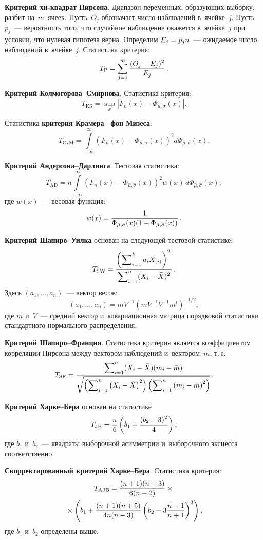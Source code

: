 \begin{multicols}{2}
\textbf{Критерий хи-квадрат Пирсона}. Диапазон переменных, образующих выборку, разбит на~$m$~ячеек. Пусть~$O_j$
обозначает число наблюдений в~ячейке~$j$. Пусть~$p_j$~--- вероятность того, что случайное наблюдение
окажется в~ячейке~$j$ при условии, что нулевая гипотеза верна. Определим $E_j\hm=p_jn$~--- ожидаемое
число наблюдений в~ячейке~$j$. Статистика критерия:
$$
T_{\mathrm{P}}=\sum\limits_{j=1}^m \displaystyle\frac{\displaystyle (O_j-E_j)^2\mathstrut}{\displaystyle E_j\mathstrut}\,.
$$

\textbf{Критерий Колмогорова--Смир\-но\-ва}. Статистика критерия:
$$
T_{\mathrm{KS}}=\sup\limits_x \left\vert F_n(x)-\Phi_{\mu,\sigma}(x)\right\vert.
$$

Статистика \textbf{критерия Крамера\,--\,фон Мизеса}:
$$
T_{\mathrm{CvM}}=\int\limits_{-\infty}^\infty \left(F_n(x)-\Phi_{\hat\mu,\hat\sigma}(x)\right)^2d\Phi_{\hat\mu,\hat\sigma}(x).
$$

\textbf{Критерий Андерсона--Дар\-лин\-га}. Тестовая статистика:
$$
T_{\mathrm{AD}}=n\int\limits_{-\infty}^\infty\left(F_n(x)-\Phi_{\hat\mu,\hat\sigma}(x)\right)^2w(x)\,d\Phi_{\hat\mu,\hat\sigma}(x),
$$
где $w(x)$~--- весовая функция:
$$
w(x)=\displaystyle\frac{\displaystyle 1\mathstrut}{\displaystyle \Phi_{\hat\mu,\hat\sigma}(x)(1-\Phi_{\hat\mu,\hat\sigma}(x))\mathstrut}\,.
$$

\textbf{Критерий Шапиро--Уил\-ка} основан на сле\-ду\-ющей тестовой статистике:
$$
T_{\mathrm{SW}}=
\displaystyle\frac{\displaystyle \left(\sum\nolimits_{i=1}^ka_iX_{(i)}\right)^2\mathstrut}{\displaystyle \sum\nolimits_{i=1}^n(X_i-\bar X)^2\mathstrut}\,.
$$
Здесь  $(a_1,\ldots ,a_n)$~--- вектор весов:
$$
\left(a_1,\ldots ,a_n\right)=m V^{-1}\left(m  V^{-1} V^{-1}  m^{t}\right)^{-1/2},$$
где $m$ и~$V$~--- средний вектор и~ковариационная матрица порядковой статистики стандартного нормального распределения.

\textbf{Критерий Шапиро--Фран\-ция}. Статистика критерия является
коэффициентом корреляции Пирсона между вектором наблюдений и~вектором~$m$, т.\,е.
$$
T_{\mathrm{SF}}=
\displaystyle\frac{\displaystyle \sum\nolimits_{i=1}^n(X_i-\bar X)(m_i-\bar m)\mathstrut}{\displaystyle \sqrt{\left(\sum\nolimits_{i=1}^n\left(X_i-\bar X\right)^2\right)\left(\sum\nolimits_{i=1}^n\left(m_i-\bar m\right)^2\right)}\mathstrut}.
$$

\textbf{Критерий Харке--Бе\-ра} основан на статистике
$$
T_{\mathrm{JB}}=\displaystyle\frac{\displaystyle n\mathstrut}{\displaystyle 6\mathstrut}\left(b_1+\displaystyle\frac{\displaystyle (b_2-3)^2\mathstrut}{\displaystyle 4\mathstrut}\right),
$$
где $b_1$ и~$b_2$~--- квадраты выборочной асимметрии и~выборочного эксцесса соответственно.

\textbf{Скорректированный критерий Хар\-ке--Бе\-ра}. Статистика критерия:
\begin{multline*}
T_{\mathrm{AJB}}=\displaystyle\frac{\displaystyle (n+1)(n+3)\mathstrut}{\displaystyle 6(n-2)\mathstrut}\times{}\\
{}\times\left(
b_1+\displaystyle\frac{\displaystyle (n+1)(n+5)\mathstrut}{\displaystyle 4n(n-3)\mathstrut}\left(b_2-3\displaystyle\frac{\displaystyle n-1\mathstrut}{\displaystyle n+1\mathstrut}\right)^2\right),
\end{multline*}
где $b_1$ и~$b_2$ определены выше.


\end{multicols}
